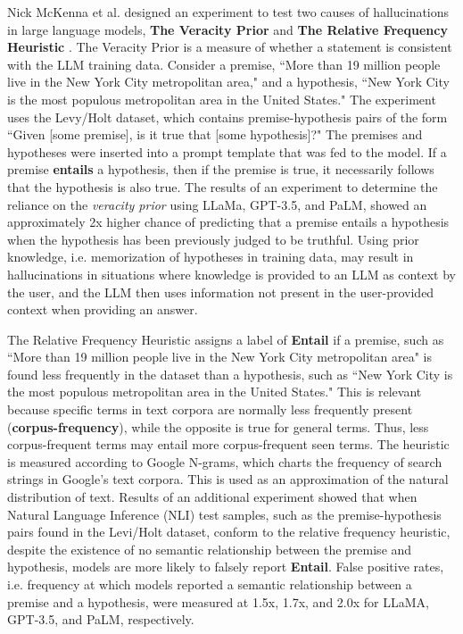\documentclass[letterpaper,12pt]{article}
\begin{document}
Nick McKenna et al. designed an experiment to test two causes of hallucinations in large language models, \textbf{The Veracity Prior} and \textbf{The Relative Frequency Heuristic}  \cite{mckenna2023sources}. The Veracity Prior is a measure of whether a statement is consistent with the LLM training data. Consider a premise, ``More than 19 million people live in the New York City metropolitan area," and a hypothesis, ``New York City is the most populous metropolitan area in the United States." The experiment uses the Levy/Holt dataset, which contains premise-hypothesis pairs of the form ``Given [some premise], is it true that [some hypothesis]?" The premises and hypotheses were inserted into a prompt template that was fed to the model. If a premise \textbf{entails} a hypothesis, then if the premise is true, it necessarily follows that the hypothesis is also true. The results of an experiment to determine the reliance on the \emph{veracity prior} using LLaMa, GPT-3.5, and PaLM, showed an approximately 2x higher chance of predicting that a premise entails a hypothesis when the hypothesis has been previously judged to be truthful. Using prior knowledge, i.e. memorization of hypotheses in training data, may result in hallucinations in situations where knowledge is provided to an LLM as context by the user, and the LLM then uses information not present in the user-provided context when providing an answer.

The Relative Frequency Heuristic assigns a label of \textbf{Entail} if a premise, such as ``More than 19 million people live in the New York City metropolitan area" is found less frequently in the dataset than a hypothesis, such as ``New York City is the most populous metropolitan area in the United States." This is relevant because specific terms in text corpora are normally less frequently present (\textbf{corpus-frequency}), while the opposite is true for general terms. Thus, less corpus-frequent terms may entail more corpus-frequent seen terms. The heuristic is measured according to Google N-grams, which charts the frequency of search strings in Google's text corpora. This is used as an approximation of the natural distribution of text. Results of an additional experiment showed that when Natural Language Inference (NLI) test samples, such as the premise-hypothesis pairs found in the Levi/Holt dataset, conform to the relative frequency heuristic, despite the existence of no semantic relationship between the premise and hypothesis, models are more likely to falsely report \textbf{Entail}. False positive rates, i.e. frequency at which models reported a semantic relationship between a premise and a hypothesis, were measured at 1.5x, 1.7x, and 2.0x for LLaMA, GPT-3.5, and PaLM, respectively.
\end{document}
